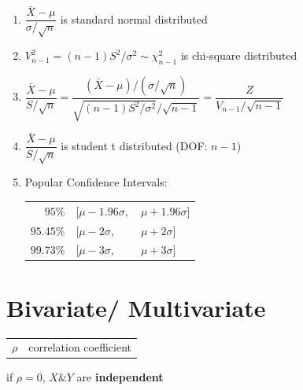 \begin{enumerate}[itemsep=0.5cm]
    \item $\dfrac{\bar{X} - \mu}{\sigma/\sqrt{n}}$ is standard normal distributed

    \item $V_{n-1}^2 = (n-1)S^2/\sigma^2 \sim \chi_{n-1}^2$ is chi-square distributed

    \item $
        \dfrac{\bar{X} - \mu}{S/\sqrt{n}}
        = \dfrac{
            {(\bar{X} - \mu)}/{(\sigma/\sqrt{n})}
        }{
            \sqrt{(n-1)S^2/\sigma^2}/\sqrt{n-1}
        }
        =\dfrac{Z}{V_{n-1}/\sqrt{n-1}}
    $

    \item $\dfrac{\bar{X} - \mu}{S/\sqrt{n}}$ is student t distributed (DOF: $n-1$)

    \item Popular Confidence Intervals:
    \begin{table}[H]
        \centering
        \begin{tabular}{r l l}
            $95\%$ & $[\mu - 1.96\sigma,$ & $\mu + 1.96\sigma]$ \\
            
            $95.45\%$ &  $[\mu - 2\sigma,$ & $\mu + 2\sigma]$ \\

            $99.73\%$ & $[\mu - 3\sigma,$ & $\mu + 3\sigma]$ \\

        \end{tabular}
    \end{table}

\end{enumerate}

\section{Bivariate/ Multivariate \cite{ism-1,mfml-1}} \label{Normal distribution: Bivariate/ Multivariate}

\begin{table}[H]
    \centering
    \begin{tabular}{l l}
        $\rho$ & correlation coefficient\\
        
    \end{tabular}
\end{table}

if $\rho = 0$, $X \& Y$ are \textbf{independent}

